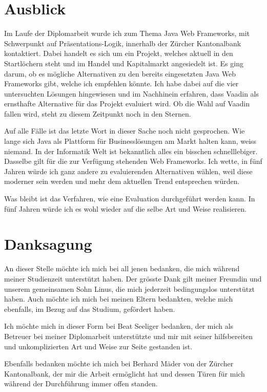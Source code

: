 \section{Ausblick}

Im Laufe der Diplomarbeit wurde ich zum Thema Java Web Frameworks, mit
Schwerpunkt auf Präsentations-Logik, innerhalb der Zürcher Kantonalbank
kontaktiert. Dabei handelt es sich um ein Projekt, welches aktuell in den
Startlöchern steht und im Handel und Kapitalmarkt angesiedelt ist. Es ging
darum, ob es mögliche Alternativen zu den bereits eingesetzten Java Web
Frameworks gibt, welche ich empfehlen könnte. Ich habe dabei auf die vier
untersuchten Lösungen hingewiesen und im Nachhinein erfahren, dass Vaadin als
ernsthafte Alternative für das Projekt evaluiert wird. Ob die Wahl auf Vaadin
fallen wird, steht zu diesem Zeitpunkt noch in den Sternen.

Auf alle Fälle ist das letzte Wort in dieser Sache noch nicht gesprochen. Wie
lange sich Java als Plattform für Businesslösungen am Markt halten kann, weiss
niemand. In der Informatik Welt ist bekanntlich alles ein bisschen
schnelllebiger. Dasselbe gilt für die zur Verfügung stehenden Web Frameworks.
Ich wette, in fünf Jahren würde ich ganz andere zu evaluierenden Alternativen
wählen, weil diese moderner sein werden und mehr dem aktuellen Trend
entsprechen würden.

Was bleibt ist das Verfahren, wie eine Evaluation durchgeführt werden kann. In
fünf Jahren würde ich es wohl wieder auf die selbe Art und Weise realisieren.

\section{Danksagung}

An dieser Stelle möchte ich mich bei all jenen bedanken, die mich während
meiner Studienzeit unterstützt haben. Der grösste Dank gilt meiner Freundin und
unserem gemeinsamen Sohn Linus, die mich jederzeit bedingungslos unterstützt
haben. Auch möchte ich mich bei meinen Eltern bedankten, welche mich
ebenfalls, im Bezug auf das Studium, gefördert haben.
  
Ich möchte mich in dieser Form bei Beat Seeliger bedanken, der mich als
Betreuer bei meiner Diplomarbeit unterstützte und mir mit seiner hilfsbereiten
und unkomplizierten Art und Weise zur Seite gestanden ist.
  
Ebenfalls bedanken möchte ich mich bei Berhard Mäder von der Zürcher
Kantonalbank, der mir die Arbeit ermöglicht hat und dessen Türen für mich
während der Durchführung immer offen standen.
  
